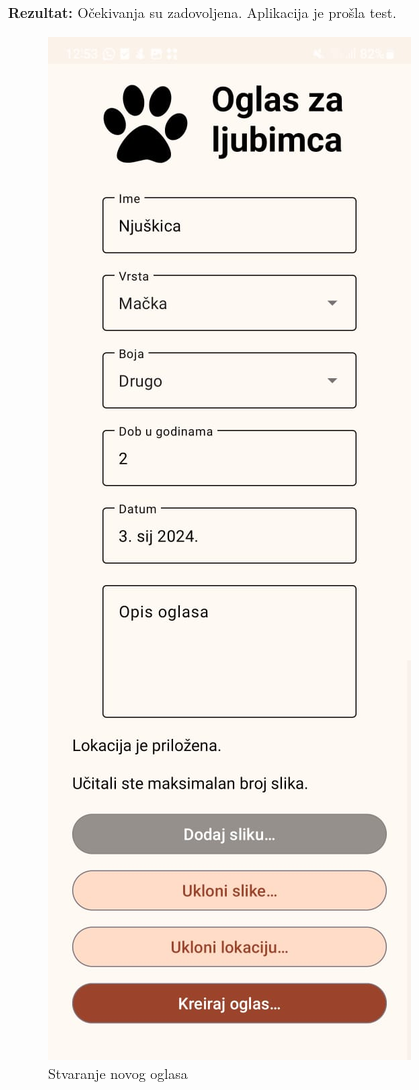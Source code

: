 			\noindent \textbf{Rezultat:} Očekivanja su zadovoljena. Aplikacija je prošla test.

			\begin{figure}[H]
			\centering
			\begin{minipage}{.5\textwidth}
	 			 \centering
				  \includegraphics[width=.58\linewidth]{slike/app2v1.jpg}
				  \caption{Stvaranje novog oglasa}
				  \label{fig:app2v1}
			\end{minipage}%
			\begin{minipage}{.5\textwidth}
				  \centering

\end{minipage}
\end{figure}

